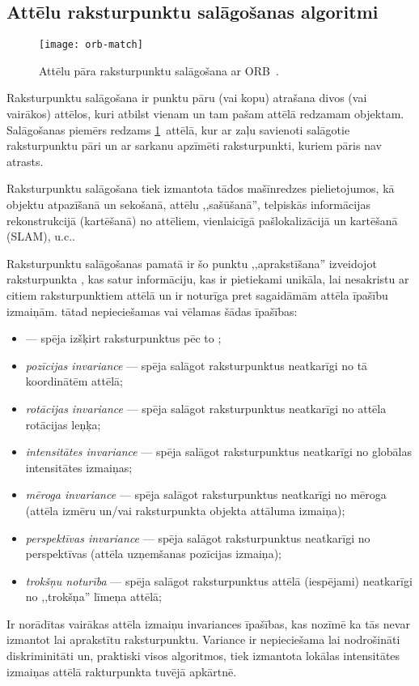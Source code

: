 \subsection{Attēlu raksturpunktu salāgošanas algoritmi} \label{sec:matching}
\begin{figure}[tbh]
	\centering
	\texttt{[image: orb-match]}
	\caption{Attēlu pāra raksturpunktu salāgošana ar ORB~\cite{ORB}.}
	\label{fig:orb}
\end{figure}

Raksturpunktu salāgošana ir punktu pāru (vai kopu) atrašana divos
(vai vairākos) attēlos, kuri atbilst vienam un tam pašam attēlā redzamam
objektam. Salāgošanas piemērs redzams \ref{fig:orb}~attēlā, kur ar zaļu
savienoti salāgotie raksturpunktu pāri un ar sarkanu apzīmēti raksturpunkti,
kuriem pāris nav atrasts.

Raksturpunktu salāgošana tiek izmantota tādos mašīnredzes pielietojumos, kā
objektu atpazīšanā un sekošanā, attēlu ,,sašūšanā'', 
telpiskās informācijas rekonstrukcijā (kartēšanā) no attēliem,
vienlaicīgā pašlokalizācijā un kartēšanā (SLAM), u.c..

Raksturpunktu salāgošanas pamatā ir šo punktu ,,aprakstīšana'' izveidojot
raksturpunkta , kas satur informāciju,
kas ir pietiekami unikāla, lai nesakristu ar citiem raksturpunktiem attēlā
un ir noturīga pret sagaidāmām attēla īpašību izmaiņām.
 tātad nepieciešamas vai vēlamas šādas īpašības:
\begin{itemize}
	\item {} --- spēja izšķirt raksturpunktus
		pēc to ;
	\item \emph{pozīcijas invariance} --- spēja salāgot raksturpunktus
		neatkarīgi no tā koordinātēm attēlā;
	\item \emph{rotācijas invariance} --- spēja salāgot raksturpunktus
		neatkarīgi no attēla rotācijas leņķa;
	\item \emph{intensitātes invariance} --- spēja salāgot raksturpunktus
		neatkarīgi no globālas intensitātes izmaiņas;
	\item \emph{mēroga invariance} --- spēja salāgot raksturpunktus
		neatkarīgi no mēroga (attēla izmēru un/vai raksturpunkta objekta attāluma izmaiņa);
	\item \emph{perspektīvas invariance} --- spēja salāgot raksturpunktus
		neatkarīgi no perspektīvas (attēla uzņemšanas pozīcijas izmaiņa);
	\item \emph{trokšņu noturība} --- spēja salāgot raksturpunktus
		attēlā (iespējami) neatkarīgi no ,,trokšņa'' līmeņa attēlā;
\end{itemize}
Ir norādītas vairākas attēla izmaiņu invariances īpašības,
kas nozīmē ka tās nevar izmantot lai aprakstītu raksturpunktu.
Variance ir nepieciešama lai nodrošināti diskriminitāti un, praktiski visos
algoritmos, tiek izmantota lokālas intensitātes izmaiņas attēlā 
rakturpunkta tuvējā apkārtnē.

